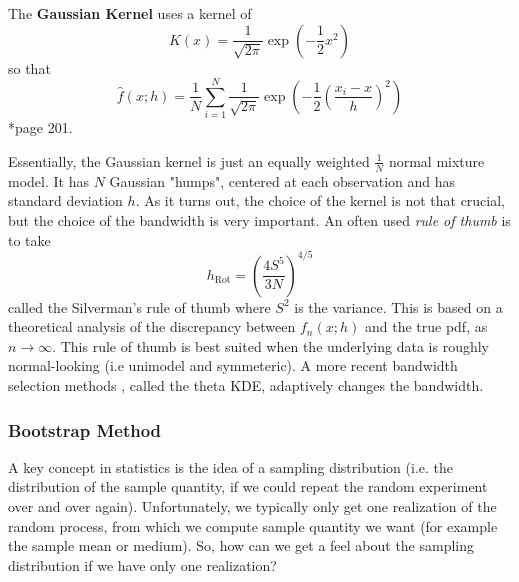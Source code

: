 \begin{defe} \label{defe: gauss_kern}
    The {\bf Gaussian Kernel} uses a kernel of
    \begin{equation*}
        K(x) = \frac{1}{\sqrt{2 \pi}} \exp \left( - \frac{1}{2} x^2 \right)
    \end{equation*}
    so that
    \begin{equation*}
        \hat{f} (x;h) = \frac{1}{N} \sum_{i=1}^{N} \frac{1}{\sqrt{2 \pi}} \exp \left( - \frac{1}{2} \left( \frac{x_i - x}{h} \right)^2 \right)
    \end{equation*}
    \cite{KroeseDirkP2013SMaC}*{page 201}.
\end{defe}
Essentially, the Gaussian kernel is just an equally weighted $\frac{1}{N}$ normal mixture model. It has $N$ Gaussian "humps", centered at each observation and has standard deviation $h$. As it turns out, the choice of the kernel is not that crucial, but the choice of the bandwidth is very important. An often used {\it rule of thumb} is to take
\begin{equation*}
    h_{\text{Rot}} = \left( \frac{4S^5}{3N} \right)^{4/5}
\end{equation*}
called the Silverman's rule of thumb where $S^2$ is the variance. This is based on a theoretical analysis of the discrepancy between $f_n (x;h)$ and the true pdf, as $n \to \infty$. This rule of thumb is best suited when the underlying data is roughly normal-looking (i.e unimodel and symmeteric). A more recent bandwidth selection methods \cite{10.1214/10-AOS799}, called the theta KDE, adaptively changes the bandwidth.

\subsubsection*{Bootstrap Method}

A key concept in statistics is the idea of a sampling distribution (i.e. the distribution of the sample quantity, if we could repeat the random experiment over and over again). Unfortunately, we typically only get one realization of the random process, from which we compute sample quantity we want (for example the sample mean or medium). So, how can we get a feel about the sampling distribution if we have only one realization?

